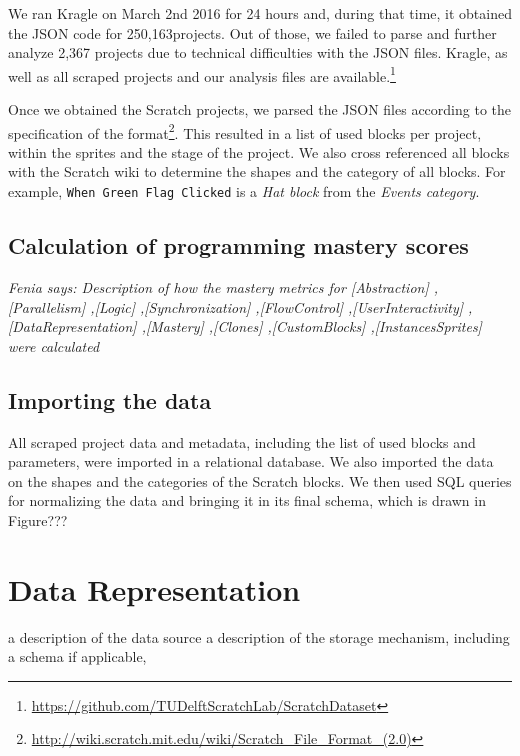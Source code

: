 \documentclass[10pt, conference]{IEEEtran}
\newcommand{\nPrograms}{250,163}
\newcommand{\fenia}[1]{\emph{\color{blue}Fenia says: #1}}
\begin{document}
We ran Kragle on March 2nd 2016 for 24 hours and, during that time, it obtained the JSON code for \nPrograms projects. Out of those, we failed to parse and further analyze 2,367 projects due to technical difficulties with the JSON files.
Kragle, as well as all scraped projects and our analysis files are available.\footnote{\label{repo}\url{https://github.com/TUDelftScratchLab/ScratchDataset}}

Once we obtained the Scratch projects, we parsed the JSON files according to the specification of the format\footnote{\url{http://wiki.scratch.mit.edu/wiki/Scratch_File_Format_(2.0)}}.
This resulted in a list of used blocks per project, within the sprites and the stage of the project.
We also cross referenced all blocks with the Scratch wiki to determine the shapes and the category of all blocks.
For example, \texttt{When Green Flag Clicked} is a \emph{Hat block} from the \emph{Events category}.

\subsection{Calculation of programming mastery scores}
\fenia{Description of how the mastery metrics for       
	[Abstraction]
	,[Parallelism]
	,[Logic]
	,[Synchronization]
	,[FlowControl]
	,[UserInteractivity]
	,[DataRepresentation]
	,[Mastery]
	,[Clones]
	,[CustomBlocks]
	,[InstancesSprites]
	were calculated}

\subsection{Importing the data}
\label{dataAnalysis}
All scraped project data and metadata, including the list of used blocks and parameters, were imported in a relational database.
We also imported the data on the shapes and the categories of the Scratch blocks.
We then used SQL queries for normalizing the data and bringing it in its final schema, which is drawn in Figure???

\section{Data Representation}
a description of the data source
a description of the storage mechanism, including a schema if applicable,
\end{document}
